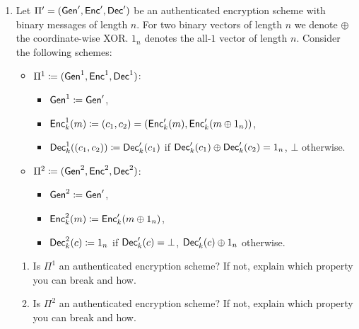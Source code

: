 \begin{enumerate}
	\item Let $\Pi'=(\Gen', \Enc', \Dec')$ be an authenticated encryption scheme with binary messages of length $n$. For two binary vectors of length $n$ we denote $\oplus$ the coordinate-wise XOR. $1_n$ denotes the all-$1$ vector of length $n$. Consider the following schemes:
	\begin{itemize}
		\item $\Pi^1 \define (\Gen^1, \Enc^1, \Dec^1)$:
		\begin{itemize}
			\item $\Gen^1 \define \Gen'$,
			\item $\Enc^1_k(m) \define (c_1, c_2) = (\Enc'_k(m), \Enc'_k(m\oplus 1_n))$,
			\item $\Dec^1_k((c_1, c_2)) \define \Dec'_k(c_1)$ if $\Dec'_k(c_1)\oplus \Dec'_k(c_2)=1_n$, $\bot$ otherwise.
		\end{itemize}
		\item $\Pi^2 \define (\Gen^2, \Enc^2, \Dec^2)$:
		\begin{itemize}
			\item $\Gen^2 \define \Gen'$,
			\item $\Enc^2_k(m) \define \Enc'_k(m \oplus 1_n)$,
			\item $\Dec^2_k(c) \define 1_n$ if $\Dec'_k(c)=\bot$, $\Dec'_k(c)\oplus 1_n$ otherwise.
		\end{itemize}
	\end{itemize}
	\begin{enumerate}
		\item Is $\Pi^1$ an authenticated encryption scheme? If not, explain which property you can break and how.
		\item Is $\Pi^2$ an authenticated encryption scheme? If not, explain which property you can break and how.
	\end{enumerate}
\end{enumerate}

